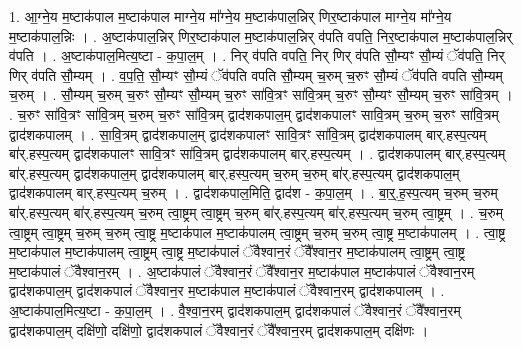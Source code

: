 \documentclass[17pt]{extarticle}
\begin{document}
1. आ॒ग्ने॒य म॒ष्टाक॑पाल म॒ष्टाक॑पाल माग्ने॒य मा᳚ग्ने॒य म॒ष्टाक॑पाल॒न्निर् णिर॒ष्टाक॑पाल माग्ने॒य मा᳚ग्ने॒य म॒ष्टाक॑पाल॒न्निः । . अ॒ष्टाक॑पाल॒न्निर् णिर॒ष्टाक॑पाल म॒ष्टाक॑पाल॒न्निर् व॑पति वपति॒ निर॒ष्टाक॑पाल म॒ष्टाक॑पाल॒न्निर् व॑पति । . अ॒ष्टाक॑पाल॒मित्य॒ष्टा - क॒पा॒ल॒म् । . निर् व॑पति वपति॒ निर् णिर् व॑पति सौ॒म्यꣳ सौ॒म्यं ॅव॑पति॒ निर् णिर् व॑पति सौ॒म्यम् । . व॒प॒ति॒ सौ॒म्यꣳ सौ॒म्यं ॅव॑पति वपति सौ॒म्यम् च॒रुम् च॒रुꣳ सौ॒म्यं ॅव॑पति वपति सौ॒म्यम् च॒रुम् । . सौ॒म्यम् च॒रुम् च॒रुꣳ सौ॒म्यꣳ सौ॒म्यम् च॒रुꣳ सा॑वि॒त्रꣳ सा॑वि॒त्रम् च॒रुꣳ सौ॒म्यꣳ सौ॒म्यम् च॒रुꣳ सा॑वि॒त्रम् । . च॒रुꣳ सा॑वि॒त्रꣳ सा॑वि॒त्रम् च॒रुम् च॒रुꣳ सा॑वि॒त्रम् द्वाद॑शकपाल॒म् द्वाद॑शकपालꣳ सावि॒त्रम् च॒रुम् च॒रुꣳ सा॑वि॒त्रम् द्वाद॑शकपालम् । . सा॒वि॒त्रम् द्वाद॑शकपाल॒म् द्वाद॑शकपालꣳ सावि॒त्रꣳ सा॑वि॒त्रम् द्वाद॑शकपालम् बार्.हस्प॒त्यम् बा॑र्.हस्प॒त्यम् द्वाद॑शकपालꣳ सावि॒त्रꣳ सा॑वि॒त्रम् द्वाद॑शकपालम् बार्.हस्प॒त्यम् । . द्वाद॑शकपालम् बार्.हस्प॒त्यम् बा॑र्.हस्प॒त्यम् द्वाद॑शकपाल॒म् द्वाद॑शकपालम् बार्.हस्प॒त्यम् च॒रुम् च॒रुम् बा॑र्.हस्प॒त्यम् द्वाद॑शकपाल॒म् द्वाद॑शकपालम् बार्.हस्प॒त्यम् च॒रुम् । . द्वाद॑शकपाल॒मिति॒ द्वाद॑श - क॒पा॒ल॒म् । . बा॒र्॒.ह॒स्प॒त्यम् च॒रुम् च॒रुम् बा॑र्.हस्प॒त्यम् बा॑र्.हस्प॒त्यम् च॒रुम् त्वा॒ष्ट्रम् त्वा॒ष्ट्रम् च॒रुम् बा॑र्.हस्प॒त्यम् बा॑र्.हस्प॒त्यम् च॒रुम् त्वा॒ष्ट्रम् । . च॒रुम् त्वा॒ष्ट्रम् त्वा॒ष्ट्रम् च॒रुम् च॒रुम् त्वा॒ष्ट्र म॒ष्टाक॑पाल म॒ष्टाक॑पालम् त्वा॒ष्ट्रम् च॒रुम् च॒रुम् त्वा॒ष्ट्र म॒ष्टाक॑पालम् । . त्वा॒ष्ट्र म॒ष्टाक॑पाल म॒ष्टाक॑पालम् त्वा॒ष्ट्रम् त्वा॒ष्ट्र म॒ष्टाक॑पालं ॅवैश्वान॒रं ॅवै᳚श्वान॒र म॒ष्टाक॑पालम् त्वा॒ष्ट्रम् त्वा॒ष्ट्र म॒ष्टाक॑पालं ॅवैश्वान॒रम् । . अ॒ष्टाक॑पालं ॅवैश्वान॒रं ॅवै᳚श्वान॒र म॒ष्टाक॑पाल म॒ष्टाक॑पालं ॅवैश्वान॒रम् द्वाद॑शकपाल॒म् द्वाद॑शकपालं ॅवैश्वान॒र म॒ष्टाक॑पाल म॒ष्टाक॑पालं ॅवैश्वान॒रम् द्वाद॑शकपालम् । . अ॒ष्टाक॑पाल॒मित्य॒ष्टा - क॒पा॒ल॒म् । . वै॒श्वा॒न॒रम् द्वाद॑शकपाल॒म् द्वाद॑शकपालं ॅवैश्वान॒रं ॅवै᳚श्वान॒रम् द्वाद॑शकपाल॒म् दक्षि॑णो॒ दक्षि॑णो॒ द्वाद॑शकपालं ॅवैश्वान॒रं ॅवै᳚श्वान॒रम् द्वाद॑शकपाल॒म् दक्षि॑णः । \newline
\end{document}
